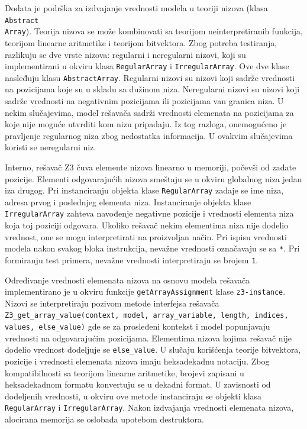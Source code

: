 \documentclass[12pt,oneside]{memoir}
\begin{document}
Dodata je podrška za izdvajanje vrednosti modela u teoriji nizova (klasa \texttt{Abstract\\Array}). Teorija nizova se može kombinovati sa teorijom neinterpretiranih funkcija, teorijom linearne aritmetike i teorijom bitvektora.
Zbog potreba testiranja, razlikuju se dve vrste nizova: regularni i neregularni nizovi, koji su implementirani u okviru klasa \texttt{RegularArray} i \texttt{IrregularArray}. Ove dve klase nasleđuju klasu \texttt{AbstractArray}. Regularni nizovi su nizovi koji sadrže vrednosti na pozicijama koje su u skladu sa dužinom niza. Neregularni nizovi su nizovi koji sadrže vrednosti na negativnim pozicijama ili pozicijama van granica niza. U nekim slučajevima, model rešavača sadrži vrednosti elemenata na pozicijama za koje nije moguće utvrditi kom nizu pripadaju. Iz tog razloga, onemogućeno je pravljenje regularnog niza zbog nedostatka informacija. U ovakvim slučajevima koristi se neregularni niz.
\par
Interno, rešavač Z3 čuva elemente nizova linearno u memoriji, počevši od zadate pozicije. Elementi odgovarajućih nizova smeštaju se u okviru globalnog niza jedan iza drugog. Pri instanciranju objekta klase \texttt{RegularArray} zadaje se ime niza, adresa prvog i poslednjeg elementa niza. Instanciranje objekta klase \texttt{IrregularArray} zahteva navođenje negativne pozicije i vrednosti elementa niza koja toj poziciji odgovara. Ukoliko rešavač nekim elementima niza nije dodelio vrednost, one se mogu interpretirati na proizvoljan način. Pri ispisu vrednosti modela nakon svakog bloka instrukcija, nevažne vrednosti označavaju se sa \texttt{*}. Pri formiranju test primera, nevažne vrednosti interpretiraju se brojem \texttt{1}.
\par
Određivanje vrednosti elemenata nizova na osnovu modela rešavača implementirano je u okviru funkcije \texttt{getArrayAssignment} klase \texttt{z3-instance}. Nizovi se interpretiraju pozivom metode interfejsa rešavača \texttt{Z3\_get\_array\_value(context, model, array\_variable, length, indices, values, else\_value)} gde se za prosleđeni kontekst i model popunjavaju vrednosti na odgovarajućim pozicijama. Elementima nizova kojima rešavač nije dodelio vrednost dodeljuje se \texttt{else\_value}. U slučaju korišćenja teorije bitvektora, pozicije i vrednosti elemenata nizova imaju heksadekadnu notaciju. Zbog kompatibilnosti sa teorijom linearne aritmetike, brojevi zapisani u heksadekadnom formatu konvertuju se u dekadni format. U zavisnosti od dodeljenih vrednosti, u okviru ove metode instanciraju se objekti klasa \texttt{RegularArray} i \texttt{IrregularArray}. Nakon izdvajanja vrednosti elemenata nizova, alocirana memorija se oslobađa upotebom destruktora.
\end{document}
